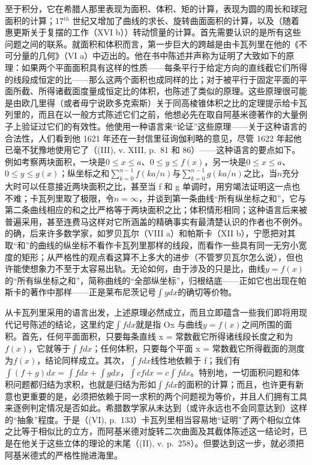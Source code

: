至于积分，它在希腊人那里表现为面积、体积、矩的计算，表现为圆的周长和球冠面积的计算；17\(^{th}\) 世纪又增加了曲线的求长、旋转曲面面积的计算，以及（随着惠更斯关于复摆的工作（XVI b））转动惯量的计算。首先需要认识的是所有这些问题之间的联系。就面积和体积而言，第一步巨大的跨越是由卡瓦列里在他的《不可分量的几何》（VI a）中迈出的。他在书中陈述并声称为证明了大致如下的原理：如果两个平面面积具有这样的性质——每条平行于给定方向的直线截它们所得的线段成恒定的比——那么这两个面积也成同样的比；对于被平行于固定平面的平面所截、所得诸截面度量成恒定比的体积，也陈述了类似的原理。这些原理很可能是由欧几里得（或者毋宁说欧多克索斯）关于同高棱锥体积之比的定理提示给卡瓦列里的，而且在以一般方式陈述它们之前，他想必先在取自阿基米德著作的大量例子上验证过它们的有效性。他使用一种语言来“论证”这些原理——关于这种语言的合法性，人们看到他 1621 年还在一封信里征询伽利略的意见，尽管 1622 年起他已毫不犹豫地使用它了（(III), v. XIII, p.~81 和 86）——这种语言的要点如下。例如考察两块面积，一块是\(0 \leqslant x \leqslant a\)、\(0 \leqslant y \leqslant f(x)\)，另一块是\(0 \leqslant x \leqslant a\)、\(0 \leqslant y \leqslant g(x)\)；纵坐标之和\(\sum_{k=0}^{n-1} f(ka/n)\)与\(\sum_{k=0}^{n-1} g(ka/n)\)之比，当\(n\)充分大时可以任意接近两块面积之比，甚至当 f 和 g 单调时，用穷竭法证明这一点也不难；卡瓦列里取了极限，令\(n = \infty\)，并谈到第一条曲线“所有纵坐标之和”，它与第二条曲线相应的和之比严格等于两块面积之比；体积情形相同；这种语言后来被普遍采用，甚至连费马这样对它所涵盖的精确事实有最清楚认识的作者也不例外。的确，后来许多数学家，如罗贝瓦尔（VIII a）和帕斯卡（XII b），宁愿把对其取“和”的曲线的纵坐标不看作卡瓦列里那样的线段，而看作一些具有同一无穷小宽度的矩形；从严格性的观点看这算不上多大的进步（不管罗贝瓦尔怎么说），但也许能使想象力不至于太容易出轨。无论如何，由于涉及的只是比，曲线\(y = f(x)\)的“所有纵坐标之和”，简称曲线的“全部纵坐标”，归根结底——正如它也出现在帕斯卡的著作中那样——正是莱布尼茨记号\(\int y dx\)的确切等价物。

从卡瓦列里采用的语言出发，上述原理必然成立，而且立即蕴含一些我们即将用现代记号陈述的结论，这里约定\(\int f dx\)就是指 Ox 与曲线\(y = f(x)\)之间所围的面积。首先，任何平面面积，只要每条直线 x = 常数截它所得诸线段长度之和为\(f(x)\)，它就等于\(\int f dx\)；任何体积，只要每个平面 x = 常数截它所得截面的测度为\(f(x)\)，结论同样成立。其次，\(\int f dx\)线性地依赖于 f；我们有\(\int (f + g) dx = \int f dx + \int g dx\)，\(\int cf dx = c \int f dx\)。特别地，一切面积问题和体积问题都归结为求积，也就是归结为形如\(\int f dx\)的面积的计算；而且，也许更有新意也更重要的是，必须把依赖于同一求积的两个问题视为等价，并且人们拥有工具来逐例判定情况是否如此。希腊数学家从未达到（或许永远也不会同意达到）这样的“抽象”程度。于是（(VI), p.~133）卡瓦列里相当容易地“证明”了两个相似立体之比等于相似比的立方，而阿基米德对旋转二次曲面及其截体陈述这一结论时，已是在他关于这些立体的理论的末尾（(II), v. p.~258）。但要达到这一步，就必须把阿基米德式的严格性抛进海里。

